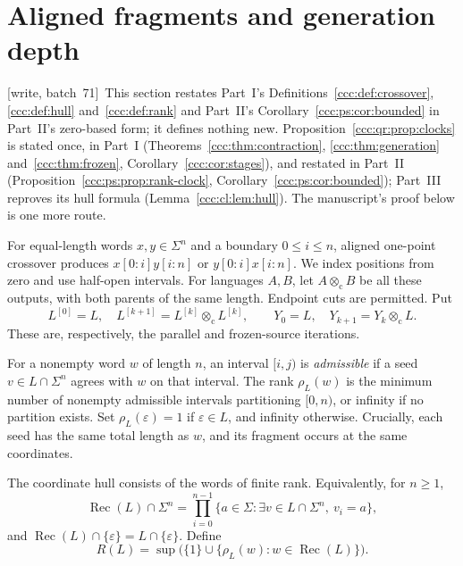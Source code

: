 \documentclass[11pt,letterpaper]{article}
\theoremstyle{definition}
\theoremstyle{remark}
\newcommand{\eps}{\varepsilon}
\newcommand{\rec}{\operatorname{Rec}}
\newcommand{\cut}{\otimes_{\mathrm c}}
\newcommand{\gen}[2]{#1^{[#2]}}
\newcommand{\rank}{\rho}
\newcommand{\wsevone}{\textup{[write, batch~71]}}
\begin{document}
\section{Aligned fragments and generation depth}\label{ccc:qr:sec:rank}

\wsevone\ This section restates Part~I's Definitions~\ref{ccc:def:crossover},
\ref{ccc:def:hull} and~\ref{ccc:def:rank} and Part~II's
Corollary~\ref{ccc:ps:cor:bounded} in Part~II's zero-based form; it defines
nothing new. Proposition~\ref{ccc:qr:prop:clocks} is stated once, in Part~I
(Theorems~\ref{ccc:thm:contraction}, \ref{ccc:thm:generation}
and~\ref{ccc:thm:frozen}, Corollary~\ref{ccc:cor:stages}), and restated in
Part~II (Proposition~\ref{ccc:ps:prop:rank-clock},
Corollary~\ref{ccc:ps:cor:bounded}); Part~III reproves its hull formula
(Lemma~\ref{ccc:cl:lem:hull}). The manuscript's proof below is one more
route.

For equal-length words $x,y\in\Sigma^n$ and a boundary $0\le i\le n$, aligned
one-point crossover produces $x[0:i]y[i:n]$ or $y[0:i]x[i:n]$. We index
positions from zero and use half-open intervals. For languages $A,B$, let
$A\cut B$ be all these outputs, with both parents of the same length.
Endpoint cuts are permitted. Put
\[
\gen L0=L,\quad \gen L{k+1}=\gen Lk\cut\gen Lk,
\qquad
Y_0=L,\quad Y_{k+1}=Y_k\cut L.
\]
These are, respectively, the parallel and frozen-source iterations.

For a nonempty word $w$ of length $n$, an interval $[i,j)$ is
\emph{admissible} if a seed $v\in L\cap\Sigma^n$ agrees with $w$ on that
interval. The rank $\rank_L(w)$ is the minimum number of nonempty admissible
intervals partitioning $[0,n)$, or infinity if no partition exists. Set
$\rank_L(\eps)=1$ if $\eps\in L$, and infinity otherwise. Crucially, each
seed has the same total length as $w$, and its fragment occurs at the same
coordinates.

The coordinate hull consists of the words of finite rank. Equivalently, for
$n\ge1$,
\[
\rec(L)\cap\Sigma^n
=\prod_{i=0}^{n-1}\{a\in\Sigma:\exists v\in L\cap\Sigma^n,\ v_i=a\},
\]
and $\rec(L)\cap\{\eps\}=L\cap\{\eps\}$. Define
\[
R(L)=\sup\bigl(\{1\}\cup\{\rank_L(w):w\in\rec(L)\}\bigr).
\]
\end{document}
